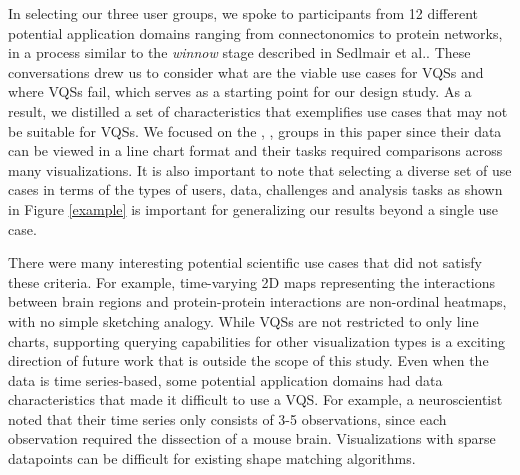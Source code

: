 { 
\par In selecting our three user groups, we spoke to participants from 12 different potential application domains ranging from connectonomics to protein networks, in a process similar to the \textit{winnow} stage described in Sedlmair et al.\cite{Sedlmair2012}. These conversations drew us to consider what are the viable use cases for VQSs and where VQSs fail, which serves as a starting point for our design study. As a result, we distilled a set of characteristics that exemplifies use cases that may not be suitable for VQSs. We focused on the \astro, \bio, \matsci groups in this paper since their data can be viewed in a line chart format and their tasks required comparisons across many visualizations. It is also important to note that selecting a diverse set of use cases in terms of the types of users, data, challenges and analysis tasks as shown in Figure \ref{example} is important for generalizing our results beyond a single use case.
\par There were many interesting potential scientific use cases that did not satisfy these criteria. For example, time-varying 2D maps representing the interactions between brain regions and protein-protein interactions are non-ordinal heatmaps, with no simple sketching analogy. While VQSs are not restricted to only line charts, supporting querying capabilities for other visualization types is a exciting direction of future work that is outside the scope of this study. Even when the data is time series-based, some potential application domains had data characteristics that made it difficult to use a VQS. For example, a neuroscientist noted that their time series only consists of 3-5  observations, since each observation required the dissection of a mouse brain. Visualizations with sparse datapoints can be difficult for existing shape matching algorithms.  
}
